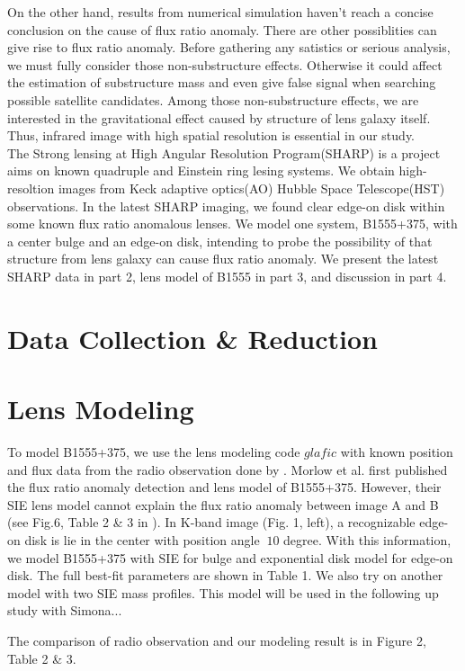 \documentclass[manuscript]{emulateapj}
\begin{document}
On the other hand, results from numerical simulation haven't reach a concise conclusion on the cause of flux ratio anomaly. There are other possiblities can give rise to flux ratio anomaly. Before gathering any satistics or serious analysis, we must fully consider those non-substructure effects. Otherwise it could affect the estimation of substructure mass and even give false signal when searching possible satellite candidates. Among those non-substructure effects, we are interested in the gravitational effect caused by structure of lens galaxy itself. Thus, infrared image with high spatial resolution is essential in our study.\\
The Strong lensing at High Angular Resolution Program(SHARP) is a project aims on known quadruple and Einstein ring lesing systems. We obtain high-resoltion images from Keck adaptive optics(AO) Hubble Space Telescope(HST) observations. In the latest SHARP imaging, we found clear edge-on disk within some known flux ratio anomalous lenses. We model one system, B1555+375, with a center bulge and an edge-on disk, intending to probe the possibility of that structure from lens galaxy can cause flux ratio anomaly. We present the latest SHARP data in part 2, lens model of B1555 in part 3, and discussion in part 4. 

\section{Data Collection \& Reduction}

\section{Lens Modeling}
To model B1555+375, we use the lens modeling code $glafic$ \citep{Oguri} with known position and flux data from the radio observation done by \citet{Marlow}. Morlow et al. first published the flux ratio anomaly detection and lens model of B1555+375. However, their SIE lens model cannot explain the flux ratio anomaly between image A and B (see Fig.6, Table 2 \& 3 in \citet{Marlow}). In K-band image (Fig. 1, left), a recognizable edge-on disk is lie in the center with position angle $~10$ degree. With this information, we model B1555+375 with SIE for bulge and exponential disk model for edge-on disk. The full best-fit parameters are shown in Table 1. We also try on another model with two SIE mass profiles. This model will be used in the following up study with Simona...

The comparison of radio observation and our modeling result is in Figure 2, Table 2 \& 3.\\
\end{document}
